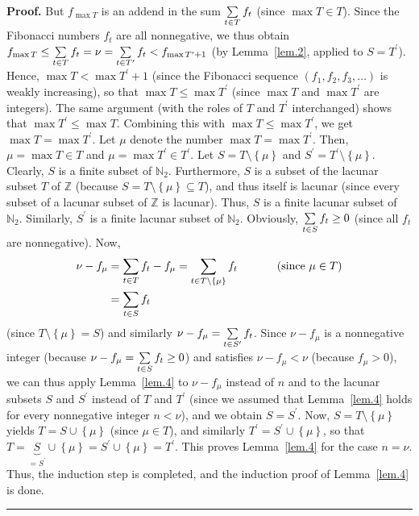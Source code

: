 \documentclass[numbers=enddot,12pt,final,onecolumn,notitlepage]{scrartcl}%
\numberwithin{exer}{section}
\theoremstyle{definition}
\newenvironment{proof}[1][Proof]{\noindent\textbf{#1.} }{\ \rule{0.5em}{0.5em}}
\let\sumnonlimits\sum
\renewcommand{\sum}{\sumnonlimits\limits}
\begin{document}
\begin{proof}
But $f_{\max T}$ is an addend in the sum $\sum\limits_{t\in T}f_{t}$ (since
$\max T \in T$). Since the Fibonacci numbers $f_{t}$ are all nonnegative, we
thus obtain $f_{\max T}\leq\sum\limits_{t\in T}f_{t}=\nu=\sum\limits_{t\in
T^{\prime}}f_{t}<f_{\max T^{\prime}+1}$ (by Lemma~\ref{lem.2}, applied to
$S=T^{\prime}$). Hence, $\max T<\max T^{\prime}+1$ (since the Fibonacci
sequence $\left(  f_{1},f_{2},f_{3},\ldots\right)  $ is weakly increasing), so
that $\max T\leq\max T^{\prime}$ (since $\max T$ and $\max T^{\prime}$ are
integers). The same argument (with the roles of $T$ and $T^{\prime}$
interchanged) shows that $\max T^{\prime}\leq\max T$. Combining this with
$\max T\leq\max T^{\prime}$, we get $\max T=\max T^{\prime}$. Let $\mu$ denote
the number $\max T=\max T^{\prime}$. Then, $\mu=\max T\in T$ and $\mu=\max
T^{\prime}\in T^{\prime}$. Let $S=T\setminus\left\{  \mu\right\}  $ and
$S^{\prime}=T^{\prime}\setminus\left\{  \mu\right\}  $. Clearly, $S$ is a
finite subset of $\mathbb{N}_{2}$. Furthermore, $S$ is a subset of the lacunar
subset $T$ of $\mathbb{Z}$ (because $S=T\setminus\left\{  \mu\right\}
\subseteq T$), and thus itself is lacunar (since every subset of a lacunar
subset of $\mathbb{Z}$ is lacunar). Thus, $S$ is a finite lacunar subset of
$\mathbb{N}_{2}$. Similarly, $S^{\prime}$ is a finite lacunar subset of
$\mathbb{N}_{2}$. Obviously, $\sum\limits_{t\in S}f_{t} \geq0$ (since all
$f_{t}$ are nonnegative). Now,%
\begin{align*}
\nu-f_{\mu}  &  =\sum\limits_{t\in T}f_{t}-f_{\mu}=\sum\limits_{t\in
T\setminus\left\{  \mu\right\}  }f_{t}\ \ \ \ \ \ \ \ \ \ \left(  \text{since
}\mu\in T\right) \\
&  =\sum\limits_{t\in S}f_{t}%
\end{align*}
(since $T\setminus\left\{  \mu\right\}  =S$) and similarly $\nu-f_{\mu}%
=\sum\limits_{t\in S^{\prime}}f_{t}$. Since $\nu-f_{\mu}$ is a nonnegative
integer (because $\nu-f_{\mu}=\sum\limits_{t\in S}f_{t} \geq0$) and satisfies
$\nu-f_{\mu}<\nu$ (because $f_{\mu}> 0$), we can thus apply Lemma~\ref{lem.4}
to $\nu-f_{\mu}$ instead of $n$ and to the lacunar subsets $S$ and $S^{\prime
}$ instead of $T$ and $T^{\prime}$ (since we assumed that Lemma~\ref{lem.4}
holds for every nonnegative integer $n<\nu$), and we obtain $S=S^{\prime}$.
Now, $S=T\setminus\left\{  \mu\right\}  $ yields $T=S\cup\left\{  \mu\right\}
$ (since $\mu\in T$), and similarly $T^{\prime}=S^{\prime}\cup\left\{
\mu\right\}  $, so that $T=\underbrace{S}_{=S^{\prime}}\cup\left\{
\mu\right\}  =S^{\prime}\cup\left\{  \mu\right\}  =T^{\prime}$. This proves
Lemma~\ref{lem.4} for the case $n=\nu$. Thus, the induction step is completed,
and the induction proof of Lemma~\ref{lem.4} is done.
\end{proof}
\end{document}
